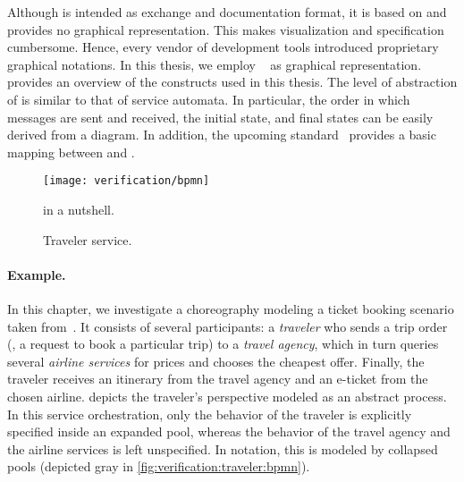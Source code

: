 Although  is intended as exchange and documentation format, it is based on  and provides no graphical representation. This makes visualization and specification cumbersome. Hence, every vendor of  development tools introduced proprietary graphical notations. In this thesis, we employ ~\cite{standard_bpmn} as graphical representation.  provides an overview of the  constructs used in this thesis. The level of abstraction of  is similar to that of service automata. In particular, the order in which messages are sent and received, the initial state, and final states can be easily derived from a  diagram. In addition, the upcoming  standard~\cite{standard_bpmn2} provides a basic mapping between  and .

\begin{figure}[tb]
\centering
{\texttt{[image: verification/bpmn]}}
\caption{ in a nutshell.}\label{fig:verfication:bpmn}
\end{figure}

\begin{figure}[tb]
\centering
{}
\caption{Traveler service.}\label{fig:verification:traveler}
\end{figure}



\paragraph{Example.}

In this chapter, we investigate a choreography modeling a ticket booking scenario taken from~\cite{DeckerKLW_2007_icws}. It consists of several participants: a \emph{traveler} who sends a trip order (\ie, a request to book a particular trip) to a \emph{travel agency}, which in turn queries several \emph{airline services} for prices and chooses the cheapest offer. Finally, the traveler receives an itinerary from the travel agency and an e-ticket from the chosen airline.  depicts the traveler's perspective modeled as an abstract  process. In this service orchestration, only the behavior of the traveler is explicitly specified inside an expanded pool, whereas the behavior of the travel agency and the airline services is left unspecified. In  notation, this is modeled by collapsed pools (depicted gray in \autoref{fig:verification:traveler:bpmn}).




